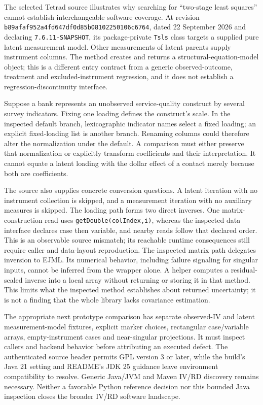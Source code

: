 The selected Tetrad source illustrates why searching for ``two-stage least
squares'' cannot establish interchangeable software coverage. At revision
\texttt{b89afaf952a4fd647df0}\allowbreak\texttt{d85b08102250106c6764}, dated 22 September 2026
and declaring \texttt{7.6.11-SNAPSHOT}, its package-private \texttt{Tsls}
class targets a supplied pure latent measurement model. Other measurements of
latent parents supply instrument columns. The method creates and returns a
structural-equation-model object; this is a different entry contract from a
generic observed-outcome, treatment and excluded-instrument regression, and
it does not establish a regression-discontinuity interface.
\citep{exec22_java_latent_iv_preflight}

Suppose a bank represents an unobserved service-quality construct by several
survey indicators. Fixing one loading defines the construct's scale. In the
inspected default branch, lexicographic indicator names select a fixed loading;
an explicit fixed-loading list is another branch. Renaming columns could
therefore alter the normalization under the default. A comparison must either
preserve that normalization or explicitly transform coefficients and their
interpretation. It cannot equate a latent loading with the dollar effect of a
contact merely because both are coefficients.

The source also supplies concrete conversion questions. A latent iteration
with no instrument collection is skipped, and a measurement iteration with
no auxiliary measures is skipped. The loading path forms two direct inverses.
One matrix-construction read uses \texttt{getDouble(colIndex,i)}, whereas the
inspected data interface declares case then variable, and nearby reads follow
that declared order. This is an observable source mismatch; its reachable
runtime consequences still require caller and data-layout reproduction.
The inspected matrix path delegates inversion to EJML. Its numerical behavior,
including failure signaling for singular inputs, cannot be inferred from the
wrapper alone. A helper computes a residual-scaled inverse into a local array
without returning or storing it in that method. This limits what the inspected
method establishes about returned uncertainty; it is not a finding that the
whole library lacks covariance estimation.\citep{exec22_java_latent_iv_preflight}

The appropriate next prototype comparison has separate observed-IV and latent
measurement-model fixtures, explicit marker choices, rectangular case/variable
arrays, empty-instrument cases and near-singular projections. It must inspect
callers and backend behavior before attributing an executed defect. The
authenticated source header permits GPL version 3 or later, while the build's
Java 21 setting and README's JDK 25 guidance leave environment compatibility
to resolve. Generic Java/JVM and Maven IV/RD discovery remains necessary.
Neither a favorable Python reference decision nor this bounded Java inspection
closes the broader IV/RD software landscape.
